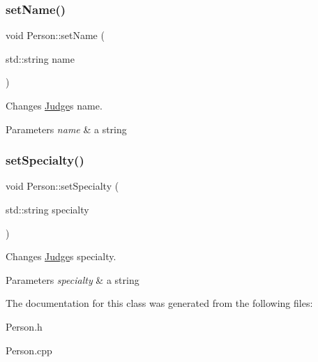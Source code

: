 \subsubsection{\texorpdfstring{set\+Name()}{setName()}}
{\footnotesize\ttfamily void Person\+::set\+Name (\begin{DoxyParamCaption}\item[{std\+::string}]{name }\end{DoxyParamCaption})}



Changes \hyperlink{class_judge}{Judge}\textquotesingle{}s name. 


\begin{DoxyParams}{Parameters}
{\em name} & a string \\
\hline
\end{DoxyParams}
\mbox{\label{class_person_a1813e3c432b72dbb4b5d7a2686c85c7e}} 
\subsubsection{\texorpdfstring{set\+Specialty()}{setSpecialty()}}
{\footnotesize\ttfamily void Person\+::set\+Specialty (\begin{DoxyParamCaption}\item[{std\+::string}]{specialty }\end{DoxyParamCaption})}



Changes \hyperlink{class_judge}{Judge}\textquotesingle{}s specialty. 


\begin{DoxyParams}{Parameters}
{\em specialty} & a string \\
\hline
\end{DoxyParams}


The documentation for this class was generated from the following files\+:\begin{DoxyCompactItemize}
\item 
Person.\+h\item 
Person.\+cpp\end{DoxyCompactItemize}
